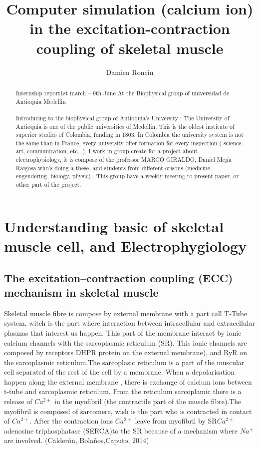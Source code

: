 \documentclass[a4paper,10pt]{report}
\title{Computer simulation (calcium ion) in the excitation-contraction coupling of skeletal muscle}
\author{Damien Roncin}
\begin{document}
\maketitle
\begin{abstract}

Internship report1st march – 9th June
At the Biophysical group of universidad de Antioquia Medellin\\
\\
Introducing to the biophysical group of Antioquia's University :
The University of Antioquia is one of the public universities of Medellin. This is the oldest institute of superior studies of Colombia, funding in 1803. In Colombia the university system is not the same than in France, every university offer formation for every inspection ( science, art, communication, etc...).
I work in group create for a project about electrophysiology, it is compose of the professor MARCO GIRALDO, Daniel Mejía Raigosa who's doing a these, and students from different orisons (medicine, engendering, biology, physic)  . This group have a weekly meeting to present paper, or other part of the project.

\end{abstract}
\tableofcontents




\chapter{Understanding basic of skeletal muscle cell, and Electrophygiology}
\section{The excitation–contraction coupling (ECC) mechanism in skeletal muscle}
Skeletal muscle fibre is compose by external membrane with a part call T-Tube system, witch is the part where interaction between intracellular and extracellular plasmas that interest us happen. This part of the membrane interact by ionic calcium channels with the sarcoplasmic reticulum (SR). This ionic channels are composed by receptors DHPR protein on the external membrane), and RyR on the sarcoplasmic reticulum.The sarcoplasic reticulum is a part of the muscular cell separated of the rest of the cell by a membrane. When a depolarisation happen along the external membrane , there is exchange of calcium ions between t-tube and sarcoplasmic reticulum. From the reticulum sarcoplamic there is a release of $Ca^{2+}$ in the myofibril (the contractile part of the muscle fibre).The myofibril is composed of sarcomere, wish is the part who is contracted in contact of $Ca^{2+}$. After the contraction ions $Ca^{2+}$ leave from myofibril by SR$Ca^{2+}$ adenosine triphosphatase (SERCA)to the SR because of a mechanism where $Na^{+}$ are involved.  (Calderón, Bolaños,Caputo, 2014)\\
\end{document}
